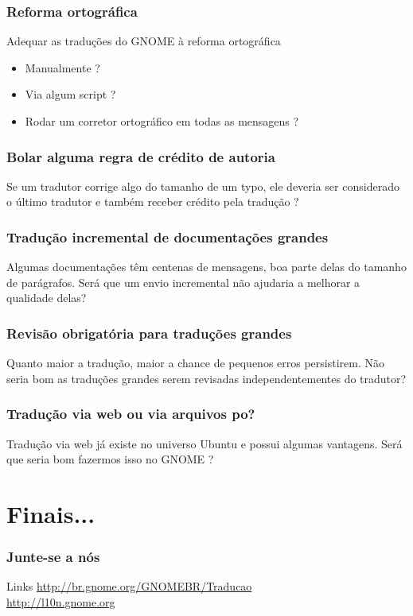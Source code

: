 \documentclass{beamer}
\begin{document}
\begin{frame}
    \frametitle{Reforma ortográfica}

    Adequar as traduções do GNOME à reforma ortográfica
    \begin{itemize}[<+->]
        \item Manualmente ? 
        \item Via algum script ?
        \item Rodar um corretor ortográfico em todas as mensagens ?  
    \end{itemize}
\end{frame}

\begin{frame}
    \frametitle{Bolar alguma regra de crédito de autoria}
    Se um tradutor corrige algo do tamanho de um typo, ele deveria ser considerado o último tradutor e também receber crédito pela tradução ? 
\end{frame}

\begin{frame}
    \frametitle{Tradução incremental de documentações grandes}
    Algumas documentações têm centenas de mensagens, boa parte delas do tamanho de parágrafos. 
    Será que um envio incremental não ajudaria a melhorar a qualidade delas?
\end{frame}

\begin{frame}
    \frametitle{Revisão obrigatória para traduções grandes}
    Quanto maior a tradução, maior a chance de pequenos erros persistirem. 
    Não seria bom as traduções grandes serem revisadas independentementes do tradutor?
\end{frame}

\begin{frame}
    \frametitle{Tradução via web ou via arquivos po?}
    Tradução via web já existe no universo Ubuntu e possui algumas vantagens. Será que seria bom
    fazermos isso no GNOME ?
\end{frame}


\section{Finais...}

\begin{frame}
  \frametitle{Junte-se a nós}
  
  \begin{block}{Links}
     \url{http://br.gnome.org/GNOMEBR/Traducao}\\
     \url{http://l10n.gnome.org}
  \end{block}
  
\end{frame}
\end{document}
